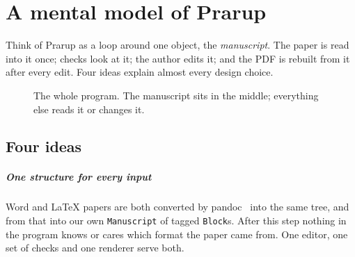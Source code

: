 \documentclass[11pt,a4paper,oneside,openany]{book}
\newcommand{\code}[1]{\texttt{#1}}
\begin{document}
\chapter{A mental model of Prarup}\label{ch:model}

\begin{takeaway}
Think of Prarup as a loop around one object, the \emph{manuscript}. The paper is read into it once; checks
look at it; the author edits it; and the PDF is rebuilt from it after every edit. Four ideas explain almost
every design choice.
\end{takeaway}

\begin{figure}[htbp]
\centering
{}
\caption{The whole program. The manuscript sits in the middle; everything else reads it or changes it.}
\label{fig:loop}
\end{figure}

\section{Four ideas}

\paragraph{One structure for every input}
Word and \LaTeX{} papers are both converted by pandoc~\cite{pandoc} into the same tree, and from that into
our own \code{Manuscript} of tagged \code{Block}s. After this step nothing in the program knows or cares which
format the paper came from. One editor, one set of checks and one renderer serve both.
\end{document}
